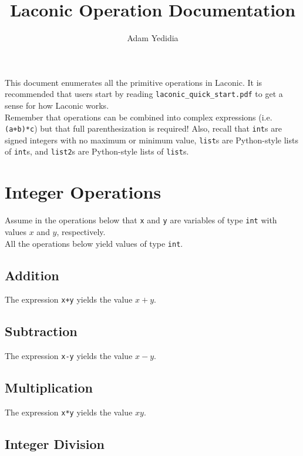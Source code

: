 \documentclass[11pt]{article}
\title{Laconic Operation Documentation}
\author{Adam Yedidia}
\begin{document}
    
\maketitle

This document enumerates all the primitive operations in Laconic. It is recommended that users start by reading \texttt{laconic_quick_start.pdf} to get a sense for how Laconic works. \\

Remember that operations can be combined into complex expressions (i.e. \texttt{(a+b)*c}) but that full parenthesization is required! Also, recall that \texttt{int}s are signed integers with no maximum or minimum value, \texttt{list}s are Python-style lists of \texttt{int}s, and \texttt{list2}s are Python-style lists of \texttt{list}s. 

\section{Integer Operations}

Assume in the operations below that \texttt{x} and \texttt{y} are variables of type \texttt{int} with values $x$ and $y$, respectively. \\

All the operations below yield values of type \texttt{int}.

\subsection{Addition}

The expression \texttt{x+y} yields the value $x+y$.

\subsection{Subtraction}

The expression \texttt{x-y} yields the value $x-y$.

\subsection{Multiplication}

The expression \texttt{x*y} yields the value $xy$.

\subsection{Integer Division}
\end{document}
